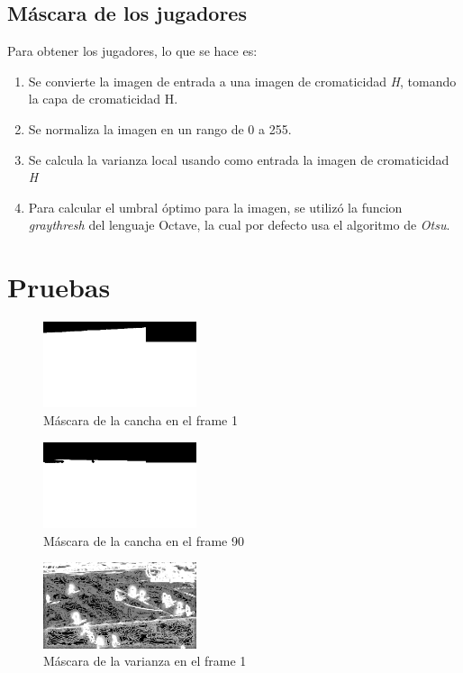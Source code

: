 \documentclass{IEEEtran}
\begin{document}
\subsection{M\'ascara de los jugadores}

Para obtener los jugadores, lo que se hace es:

\begin{enumerate}
\item Se convierte la imagen de entrada a una imagen de cromaticidad \emph{H}, tomando la capa de cromaticidad H.
\item Se normaliza la imagen en un rango de 0 a 255.
\item Se calcula la varianza local usando como entrada la imagen de cromaticidad \emph{H}
\item Para calcular el umbral \'optimo para la imagen, se utiliz\'o la funcion \emph{graythresh} del lenguaje Octave, la cual por defecto usa el algoritmo de \emph{Otsu}.
\end{enumerate}

\section{Pruebas}

\begin{figure}[!ht]
  \caption{M\'ascara de la cancha en el frame 1}
  \centering
    \includegraphics[width=0.4\textwidth]{frameCancha.png}
\end{figure}

\begin{figure}[!ht]
  \caption{M\'ascara de la cancha en el frame 90}
  \centering
    \includegraphics[width=0.4\textwidth]{frameCancha90.png}
\end{figure}

\begin{figure}[!ht]
  \caption{M\'ascara de la varianza en el frame 1}
  \centering
    \includegraphics[width=0.4\textwidth]{frameVarianza.png}
\end{figure}
\end{document}
